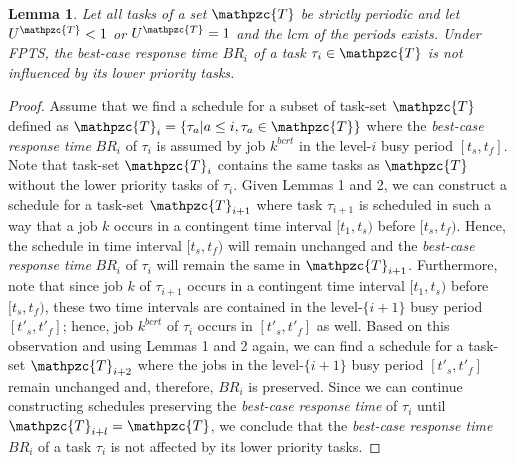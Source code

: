 \documentclass[fleqn]{article}
\newtheorem{lemma}{Lemma}
\begin{document}

\begin{lemma}
	Let all tasks of a set $\mathpzc{T}$ be strictly periodic and let $U^{\mathpzc{T}}<1$ or $U^{\mathpzc{T}}=1$ and the lcm of the periods exists. Under FPTS, the best-case response time $BR_i$ of a task $\tau_i \in \mathpzc{T}$ is not influenced by its lower priority tasks.
\end{lemma}

\begin{proof}
	Assume that we find a schedule for a subset of task-set $\mathpzc{T}$ defined as $\mathpzc{T}_i = \{\tau_a | a \leq i, \tau_a \in \mathpzc{T}\}$ where the \textit{best-case response time} $BR_i$ of $\tau_i$ is assumed by job $k^{bcrt}$ in the level-$i$ busy period $[t_{s},t_{f}]$. Note that task-set $\mathpzc{T}_i$ contains the same tasks as $\mathpzc{T}$ without the lower priority tasks of $\tau_i$. Given Lemmas 1 and 2, we can construct a schedule for a task-set $\mathpzc{T}_{i+1}$ where task $\tau_{i+1}$ is scheduled in such a way that a job $k$ occurs in a contingent time interval $[t_1, t_s)$ before $[t_s,t_f)$. Hence, the schedule in time interval $[t_s,t_f)$ will remain unchanged and the \textit{best-case response time} $BR_i$ of $\tau_i$ will remain the same in $\mathpzc{T}_{i+1}$. Furthermore, note that since job $k$ of $\tau_{i+1}$ occurs in a contingent time interval $[t_1, t_s)$ before $[t_s,t_f)$, these two time intervals are contained in the level-$\{i+1\}$ busy period $[t\prime_s,t\prime_f]$; hence, job $k^{bcrt}$ of $\tau_i$ occurs in $[t\prime_s,t\prime_f]$ as well. Based on this observation and using Lemmas 1 and 2 again, we can find a schedule for a task-set $\mathpzc{T}_{i+2}$ where the jobs in the  level-$\{i+1\}$ busy period $[t\prime_s,t\prime_f]$ remain unchanged and, therefore, $BR_i$ is preserved. Since we can continue constructing schedules preserving the \textit{best-case response time} of $\tau_i$ until $\mathpzc{T}_{i+l} = \mathpzc{T}$, we conclude that the \textit{best-case response time} $BR_i$ of a task $\tau_i$ is not affected by its lower priority tasks.
\end{proof}
\end{document}
